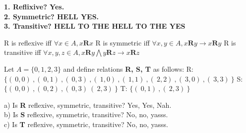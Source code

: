 \documentclass[12pt]{minimal}
\begin{document}
\textbf{
1. Reflixive? Yes. \\
2. Symmetric? HELL YES. \\
3. Transitive? HELL TO THE HELL TO THE YES \\
}

R is reflexive iff $\forall x \in A, x \textbf{R} x$
R is symmetric iff $\forall x, y \in A, x \textbf{R} y \rightarrow x \textbf{R} y$
R is transitive iff $\forall x, y, z \in A, x \textbf{R} y \bigwedge y \textbf{R} z \rightarrow x \textbf{R} z $

Let $A = \{0,1,2,3\}$ and define relations \textbf{R, S, T} as follows:
R: $\{ (\ 0,0 )\ , (\ 0,1 )\ , (\ 0,3 )\ , (\ 1,0 )\ , (\ 1,1 )\ , (\ 2,2 )\ , (\ 3,0 )\ , (\ 3,3 )\ \}$
S: $\{ (\ 0,0 )\ , (\ 0,2 )\ , (\ 0,3 )\  (\ 2,3 )\ \}$
T: $\{ (\ 0,1 )\ , (\ 2,3 )\ \}$


\noindent
a) Is \textbf{R} reflexive, symmetric, transitive? Yes, Yes, Nah.\\
b) Is \textbf{S} reflexive, symmetric, transitive? No, no, yasss.\\
c) Is \textbf{T} reflexive, symmetric, transitive? No, no, yasss.\\
\end{document}
